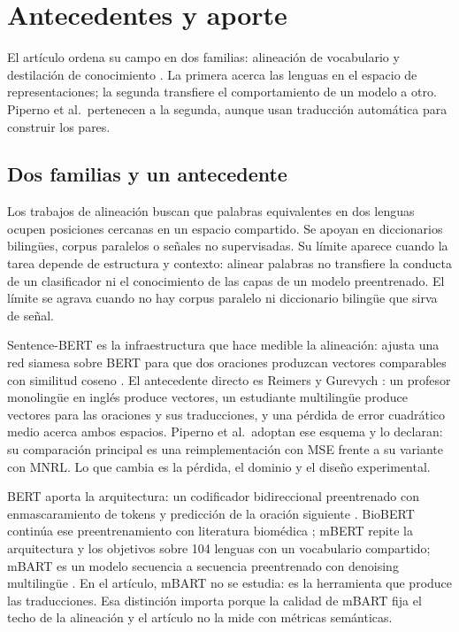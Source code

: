 \section{Antecedentes y aporte}
\label{sec:antecedentes}

El artículo ordena su campo en dos familias: alineación de vocabulario y destilación de conocimiento \cite{piperno2025}. La primera acerca las lenguas en el espacio de representaciones; la segunda transfiere el comportamiento de un modelo a otro. Piperno et al.\ pertenecen a la segunda, aunque usan traducción automática para construir los pares.

\subsection{Dos familias y un antecedente}

Los trabajos de alineación buscan que palabras equivalentes en dos lenguas ocupen posiciones cercanas en un espacio compartido. Se apoyan en diccionarios bilingües, corpus paralelos o señales no supervisadas. Su límite aparece cuando la tarea depende de estructura y contexto: alinear palabras no transfiere la conducta de un clasificador ni el conocimiento de las capas de un modelo preentrenado. El límite se agrava cuando no hay corpus paralelo ni diccionario bilingüe que sirva de señal.

Sentence-BERT es la infraestructura que hace medible la alineación: ajusta una red siamesa sobre BERT para que dos oraciones produzcan vectores comparables con similitud coseno \cite{reimers2019}. El antecedente directo es Reimers y Gurevych \cite{reimers2020}: un profesor monolingüe en inglés produce vectores, un estudiante multilingüe produce vectores para las oraciones y sus traducciones, y una pérdida de error cuadrático medio acerca ambos espacios. Piperno et al.\ adoptan ese esquema y lo declaran: su comparación principal es una reimplementación con MSE frente a su variante con MNRL. Lo que cambia es la pérdida, el dominio y el diseño experimental.

BERT aporta la arquitectura: un codificador bidireccional preentrenado con enmascaramiento de tokens y predicción de la oración siguiente \cite{devlin2019}. BioBERT continúa ese preentrenamiento con literatura biomédica \cite{lee2020}; mBERT repite la arquitectura y los objetivos sobre 104 lenguas con un vocabulario compartido; mBART es un modelo secuencia a secuencia preentrenado con denoising multilingüe \cite{liu2020}. En el artículo, mBART no se estudia: es la herramienta que produce las traducciones. Esa distinción importa porque la calidad de mBART fija el techo de la alineación y el artículo no la mide con métricas semánticas.

